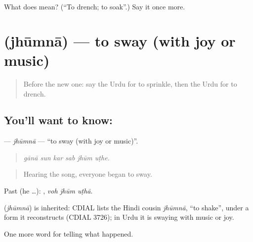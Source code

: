 \begin{tcolorbox}[breakable,colback=teal!4,colframe=teal!35!black,title={Before you move on}]
What does  mean? (\textquotedblleft{}To drench; to soak\textquotedblright{}.) Say it once more.
\end{tcolorbox}
\section[\texorpdfstring{\ur{جھومنا} (jhūmnā)}{جھومنا (jhūmnā)}]{ (jhūmnā) — to sway (with joy or music)}

\label{lesson:UR-C320-jhumna}



\begin{quote}
Before the new one: say the Urdu for to sprinkle, then the Urdu for to drench.
\end{quote}

\subsection*{You'll want to know: }
\textbf{} — \emph{jhūmnā} — \textquotedblleft{}to sway (with joy or music)\textquotedblright{}.

\begin{quote}
     
\end{quote}

\begin{quote}
\emph{gānā sun kar sab jhūm uṭhe.}
\end{quote}

\begin{quote}
Hearing the song, everyone began to sway.
\end{quote}

Past (he …):   , \emph{voh jhūm uṭhā}.

\begin{cousinweb}
\textbf{} (\emph{jhūmnā}) is inherited: CDIAL lists the Hindi cousin \emph{jhūmnā}, \textquotedblleft{}to shake\textquotedblright{}, under a form it reconstructs (CDIAL 3726); in Urdu it is swaying with music or joy.
\end{cousinweb}

\begin{grammarlens}[title={What you've built}]
One more word for telling what happened.
\end{grammarlens}

